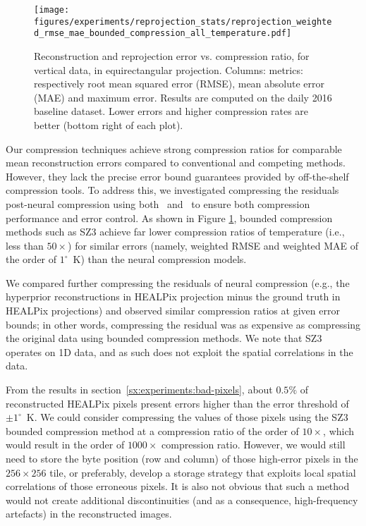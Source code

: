 \documentclass[11pt, a4paper, logo, copyright, numbering]{googledeepmind}
\begin{document}
\begin{figure}
    \centering
    \texttt{[image: figures/experiments/reprojection\_stats/reprojection\_weighted\_rmse\_mae\_bounded\_compression\_all\_temperature.pdf]}
    \hfill
    \caption{Reconstruction and reprojection error vs. compression ratio, for vertical data, in equirectangular projection. Columns: metrics: respectively root mean squared error (RMSE), mean absolute error (MAE) and maximum error. Results are computed on the daily 2016 baseline dataset. Lower errors and higher compression rates are better (bottom right of each plot).}
    \label{fig:reprojection_error_vs_cr_bounded_compression}
\end{figure}

Our compression techniques achieve strong compression ratios for comparable mean reconstruction errors compared to conventional and competing methods.
However, they lack the precise error bound guarantees provided by off-the-shelf compression tools. 
To address this, we investigated compressing the residuals post-neural compression using both~\citet{sz3_algo} and~\citet{zfpy_2014} to ensure both compression performance and error control. As shown in Figure \ref{fig:reprojection_error_vs_cr_bounded_compression}, bounded compression methods such as SZ3 achieve far lower compression ratios of temperature (i.e., less than $50\times$) for similar errors (namely, weighted RMSE and weighted MAE of the order of $1^\circ$~K) than the neural compression models.

We compared further compressing the residuals of neural compression (e.g., the hyperprior reconstructions in HEALPix projection minus the ground truth in HEALPix projections) and observed similar compression ratios at given error bounds; in other words, compressing the residual was as expensive as compressing the original data using bounded compression methods. We note that SZ3 operates on 1D data, and as such does not exploit the spatial correlations in the data.

From the results in section~\ref{sx:experiments:bad-pixels}, about $0.5\%$ of reconstructed HEALPix pixels present errors higher than the error threshold of $\pm 1^\circ$~K. We could consider compressing the values of those pixels using the SZ3 bounded compression method at a compression ratio of the order of $10\times$, which would result in the order of $1000\times$ compression ratio. However, we would still need to store the byte position (row and column) of those high-error pixels in the $256 \times 256$ tile, or preferably, develop a storage strategy that exploits local spatial correlations of those erroneous pixels. It is also not obvious that such a method would not create additional discontinuities (and as a consequence, high-frequency artefacts) in the reconstructed images. 
\end{document}
